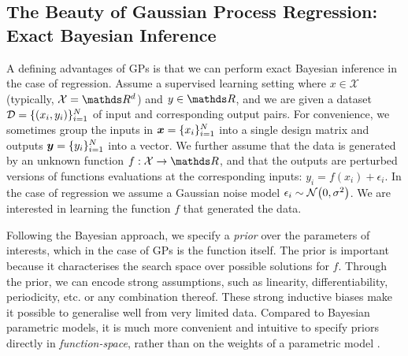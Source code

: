 \subsection{The Beauty of Gaussian Process Regression: Exact Bayesian Inference}
\label{sec:gp-exact-inference}

A defining advantages of GPs is that we can perform exact Bayesian inference in the case of regression. %
Assume a supervised learning setting where $x \in \mathcal{X}$ (typically, $\mathcal{X} = \Reals^d$) and $y \in \Reals$, and we are given a dataset $\mathcal{D} = \{(x_i, y_i)\}_{i=1}^N$ of input and corresponding output pairs. For convenience, we sometimes group the inputs in $\bm{x} = \{x_i\}_{i=1}^N$ into a single design matrix and outputs $\bm{y} = \{y_i\}_{i=1}^N$ into a vector. We further assume that the data is generated by an unknown function $f: \mathcal{X} \rightarrow \Reals$, and that the outputs are perturbed versions of functions evaluations at the corresponding inputs: $y_i = f(x_i) + \epsilon_i$. In the case of regression we assume a Gaussian noise model $\epsilon_i \sim \NormDist{0, \sigma^2}$. We are interested in learning the function $f$ that generated the data. %


Following the Bayesian approach, we specify a \emph{prior} over the parameters of interests, which in the case of GPs is the function itself. The prior is important because it characterises the search space over possible solutions for $f$. Through the prior, we can encode strong assumptions, such as linearity, differentiability, periodicity, etc. or any combination thereof. These strong inductive biases make it possible to generalise well from very limited data. Compared to Bayesian parametric models, it is much more convenient and intuitive to specify priors directly in \emph{function-space}, rather than on the weights of a parametric model \citep{rasmussen2006}. 


